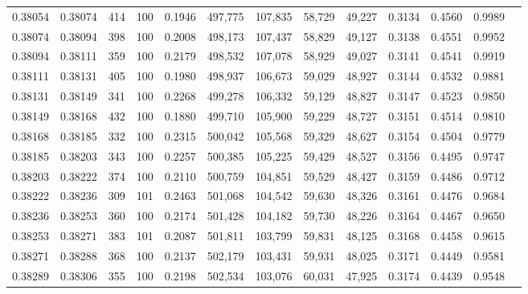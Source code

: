 \begin{tabular}{rrrrrrrrrrrrr}
0.38054 & 0.38074 &   414 & 100 &                                     0.1946 & 497,775 & 107,835 &  58,729 &  49,227 & 0.3134 & 0.4560 & 0.9989 \\
0.38074 & 0.38094 &   398 & 100 &                                     0.2008 & 498,173 & 107,437 &  58,829 &  49,127 & 0.3138 & 0.4551 & 0.9952 \\
0.38094 & 0.38111 &   359 & 100 &                                     0.2179 & 498,532 & 107,078 &  58,929 &  49,027 & 0.3141 & 0.4541 & 0.9919 \\
0.38111 & 0.38131 &   405 & 100 &                                     0.1980 & 498,937 & 106,673 &  59,029 &  48,927 & 0.3144 & 0.4532 & 0.9881 \\
0.38131 & 0.38149 &   341 & 100 &                                     0.2268 & 499,278 & 106,332 &  59,129 &  48,827 & 0.3147 & 0.4523 & 0.9850 \\
0.38149 & 0.38168 &   432 & 100 &                                     0.1880 & 499,710 & 105,900 &  59,229 &  48,727 & 0.3151 & 0.4514 & 0.9810 \\
0.38168 & 0.38185 &   332 & 100 &                                     0.2315 & 500,042 & 105,568 &  59,329 &  48,627 & 0.3154 & 0.4504 & 0.9779 \\
0.38185 & 0.38203 &   343 & 100 &                                     0.2257 & 500,385 & 105,225 &  59,429 &  48,527 & 0.3156 & 0.4495 & 0.9747 \\
0.38203 & 0.38222 &   374 & 100 &                                     0.2110 & 500,759 & 104,851 &  59,529 &  48,427 & 0.3159 & 0.4486 & 0.9712 \\
0.38222 & 0.38236 &   309 & 101 &                                     0.2463 & 501,068 & 104,542 &  59,630 &  48,326 & 0.3161 & 0.4476 & 0.9684 \\
0.38236 & 0.38253 &   360 & 100 &                                     0.2174 & 501,428 & 104,182 &  59,730 &  48,226 & 0.3164 & 0.4467 & 0.9650 \\
0.38253 & 0.38271 &   383 & 101 &                                     0.2087 & 501,811 & 103,799 &  59,831 &  48,125 & 0.3168 & 0.4458 & 0.9615 \\
0.38271 & 0.38288 &   368 & 100 &                                     0.2137 & 502,179 & 103,431 &  59,931 &  48,025 & 0.3171 & 0.4449 & 0.9581 \\
0.38289 & 0.38306 &   355 & 100 &                                     0.2198 & 502,534 & 103,076 &  60,031 &  47,925 & 0.3174 & 0.4439 & 0.9548 \\

\end{tabular}
